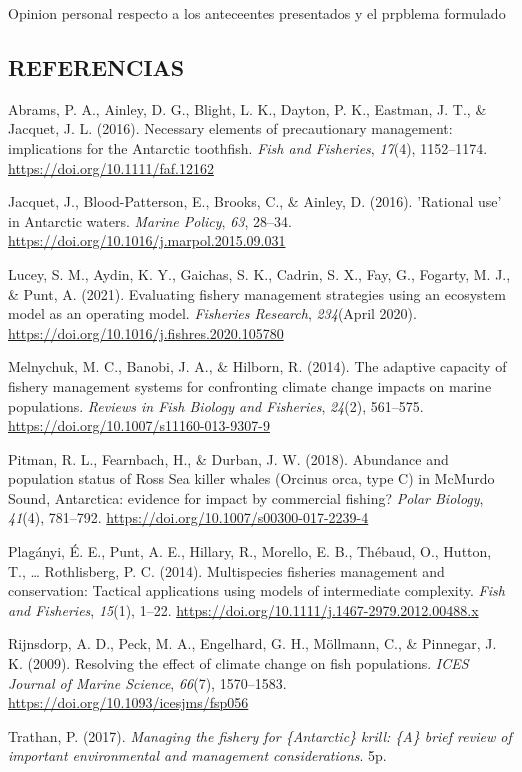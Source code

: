 \documentclass[
]{article}
\newlength{\cslhangindent}
\newenvironment{cslreferences}%
  {\setlength{\parindent}{0pt}%
  \everypar{\setlength{\hangindent}{\cslhangindent}}\ignorespaces}%
  {\par}
\begin{document}
Opinion personal respecto a los anteceentes presentados y el prpblema
formulado

\pagebreak

\hypertarget{referencias}{%
\subsection*{REFERENCIAS}\label{referencias}}

\hypertarget{refs}{}
\begin{cslreferences}
\leavevmode\hypertarget{ref-Abrams2016a}{}%
Abrams, P. A., Ainley, D. G., Blight, L. K., Dayton, P. K., Eastman, J.
T., \& Jacquet, J. L. (2016). Necessary elements of precautionary
management: implications for the Antarctic toothfish. \emph{Fish and
Fisheries}, \emph{17}(4), 1152--1174.
\url{https://doi.org/10.1111/faf.12162}

\leavevmode\hypertarget{ref-Jacquet2016a}{}%
Jacquet, J., Blood-Patterson, E., Brooks, C., \& Ainley, D. (2016).
'Rational use' in Antarctic waters. \emph{Marine Policy}, \emph{63},
28--34. \url{https://doi.org/10.1016/j.marpol.2015.09.031}

\leavevmode\hypertarget{ref-Lucey2021}{}%
Lucey, S. M., Aydin, K. Y., Gaichas, S. K., Cadrin, S. X., Fay, G.,
Fogarty, M. J., \& Punt, A. (2021). Evaluating fishery management
strategies using an ecosystem model as an operating model.
\emph{Fisheries Research}, \emph{234}(April 2020).
\url{https://doi.org/10.1016/j.fishres.2020.105780}

\leavevmode\hypertarget{ref-Melnychuk2014}{}%
Melnychuk, M. C., Banobi, J. A., \& Hilborn, R. (2014). The adaptive
capacity of fishery management systems for confronting climate change
impacts on marine populations. \emph{Reviews in Fish Biology and
Fisheries}, \emph{24}(2), 561--575.
\url{https://doi.org/10.1007/s11160-013-9307-9}

\leavevmode\hypertarget{ref-Pitman2018a}{}%
Pitman, R. L., Fearnbach, H., \& Durban, J. W. (2018). Abundance and
population status of Ross Sea killer whales (Orcinus orca, type C) in
McMurdo Sound, Antarctica: evidence for impact by commercial fishing?
\emph{Polar Biology}, \emph{41}(4), 781--792.
\url{https://doi.org/10.1007/s00300-017-2239-4}

\leavevmode\hypertarget{ref-Plaganyi2014}{}%
Plagányi, É. E., Punt, A. E., Hillary, R., Morello, E. B., Thébaud, O.,
Hutton, T., \ldots{} Rothlisberg, P. C. (2014). Multispecies fisheries
management and conservation: Tactical applications using models of
intermediate complexity. \emph{Fish and Fisheries}, \emph{15}(1), 1--22.
\url{https://doi.org/10.1111/j.1467-2979.2012.00488.x}

\leavevmode\hypertarget{ref-Rijnsdorp2009}{}%
Rijnsdorp, A. D., Peck, M. A., Engelhard, G. H., Möllmann, C., \&
Pinnegar, J. K. (2009). Resolving the effect of climate change on fish
populations. \emph{ICES Journal of Marine Science}, \emph{66}(7),
1570--1583. \url{https://doi.org/10.1093/icesjms/fsp056}

\leavevmode\hypertarget{ref-Trathan2017}{}%
Trathan, P. (2017). \emph{Managing the fishery for \{Antarctic\} krill:
\{A\} brief review of important environmental and management
considerations}. 5p.
\end{cslreferences}
\end{document}
